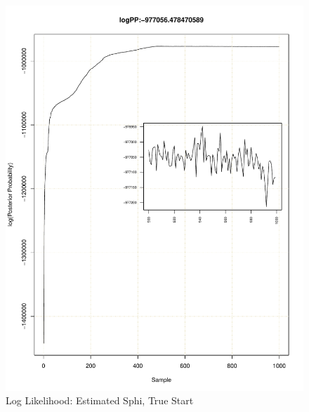\documentclass[11pt]{labbook}
\begin{document}
    \begin{figure}
        \centering
        \includegraphics[scale=.65]{FONSE_Plots/2016/November_9/estSphi_sim_like}
        \caption{Log Likelihood: Estimated Sphi, True Start}
        \label{fig:NOV9_E.S.LIK}
    \end{figure}
\end{document}
